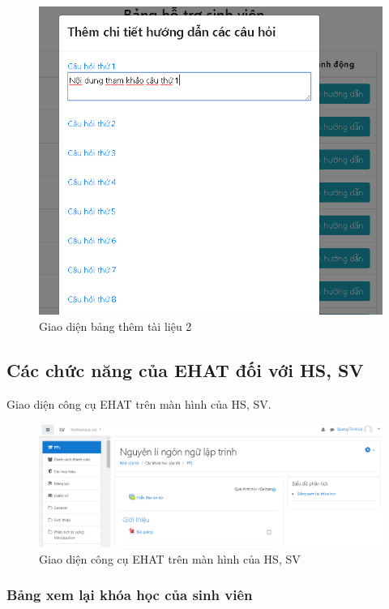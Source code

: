 \begin{center}
	\begin{figure}[htp]
		\begin{center}
			\includegraphics[width=0.6\linewidth]{img/31}
		\end{center}
		\caption{Giao diện bảng thêm tài liệu 2}
		\label{refhinh63}
	\end{figure}
\end{center}

\newpage
\subsection{Các chức năng của EHAT đối với HS, SV}

Giao diện công cụ EHAT trên màn hình của HS, SV.

\begin{center}
	\begin{figure}[htp]
		\begin{center}
			\includegraphics[width=1\linewidth]{img/32}
		\end{center}
		\caption{Giao diện công cụ EHAT trên màn hình của HS, SV}
		\label{refhinh64}
	\end{figure}
\end{center}

\newpage
\subsubsection{Bảng xem lại khóa học của sinh viên}

